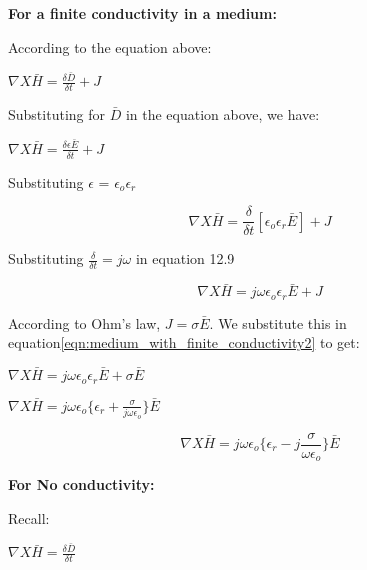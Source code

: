 \textbf{For a finite conductivity in a medium:}

According to the equation above:

\begin{center}
$\nabla X \bar{H} = \frac{\delta \bar{D}}{\delta t} + J$
\end{center}

Substituting for $\bar{D}$ in the equation above, we have:

\begin{center}
$\nabla X \bar{H} = \frac{\delta\epsilon\bar{E}}{\delta t} + J$
\end{center}

Substituting $\epsilon$ = $\epsilon_{o}\epsilon_{r}$

\begin{equation}
\nabla X \bar{H} = \frac{\delta}{\delta t}[\epsilon_{o}\epsilon_{r}\bar{E}] + J
\label{medium_with_finite_conductivity}
\end{equation}

Substituting $\frac{\delta}{\delta t} = j\omega$ in equation 12.9 %

\begin{equation}
\nabla X \bar{H} = j\omega\epsilon_{o}\epsilon_{r}\bar{E} + J
\label{eqn:medium_with_finite_conductivity2}
\end{equation}

According to Ohm's law, $J = \sigma\bar{E}$. We substitute this in equation\ref{eqn:medium_with_finite_conductivity2} to get:

\begin{center}
$\nabla X \bar{H} = j\omega\epsilon_{o}\epsilon_{r}\bar{E} + \sigma\bar{E}$ 
\end{center}

\begin{center}
$\nabla X \bar{H} = j\omega\epsilon_{o}\{\epsilon_{r} + \frac{\sigma}{j\omega\epsilon_{o}}\}\bar{E}$ 
\end{center}

\begin{equation}
\nabla X \bar{H} = j\omega\epsilon_{o}\Bigg\{\epsilon_{r} -j \frac{\sigma}{\omega\epsilon_{o}}\Bigg\}\bar{E} 
\end{equation}

\textbf{For No conductivity:}

Recall:

\begin{center}
$\nabla X \bar{H} = \frac{\delta \bar {D}}{\delta t}$
\end{center}
\begin{equation}\end{equation}

